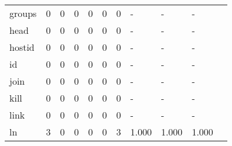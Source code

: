\begin{longtable}{lp{1.10cm}p{1.10cm}p{1.10cm}p{1.10cm}p{1.10cm}p{1.10cm}p{1.10cm}p{1.10cm}p{1.10cm}p{1.10cm}}
groups    &                      0 &                                  0 &                                 0 &                                0 &                                 0 &                               0 &                              - &                                     - &                                   - \\
head      &                      0 &                                  0 &                                 0 &                                0 &                                 0 &                               0 &                              - &                                     - &                                   - \\
hostid    &                      0 &                                  0 &                                 0 &                                0 &                                 0 &                               0 &                              - &                                     - &                                   - \\
id        &                      0 &                                  0 &                                 0 &                                0 &                                 0 &                               0 &                              - &                                     - &                                   - \\
join      &                      0 &                                  0 &                                 0 &                                0 &                                 0 &                               0 &                              - &                                     - &                                   - \\
kill      &                      0 &                                  0 &                                 0 &                                0 &                                 0 &                               0 &                              - &                                     - &                                   - \\
link      &                      0 &                                  0 &                                 0 &                                0 &                                 0 &                               0 &                              - &                                     - &                                   - \\
ln        &                      3 &                                  0 &                                 0 &                                0 &                                 0 &                               3 &                          1.000 &                                 1.000 &                               1.000 \\

\end{longtable}
